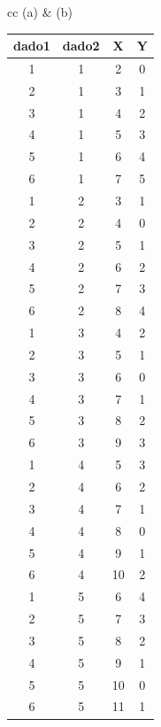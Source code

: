 \begin{ejemplo}
\begin{table}[p]
\begin{center}
\begin{tabular}{cc}
(a) & (b)\\[5mm]
{\scriptsize
\begin{tabular}{|c|c|c|c|}
  \hline
dado1 & dado2 & X & Y \\
  \hline
  1 &   1 &   2 &   0 \\ \hline
    2 &   1 &   3 &   1 \\ \hline
    3 &   1 &   4 &   2 \\ \hline
    4 &   1 &   5 &   3 \\ \hline
    5 &   1 &   6 &   4 \\ \hline
    6 &   1 &   7 &   5 \\ \hline
    1 &   2 &   3 &   1 \\ \hline
    2 &   2 &   4 &   0 \\ \hline
    3 &   2 &   5 &   1 \\ \hline
    4 &   2 &   6 &   2 \\ \hline
    5 &   2 &   7 &   3 \\ \hline
    6 &   2 &   8 &   4 \\ \hline
    1 &   3 &   4 &   2 \\ \hline
    2 &   3 &   5 &   1 \\ \hline
    3 &   3 &   6 &   0 \\ \hline
    4 &   3 &   7 &   1 \\ \hline
    5 &   3 &   8 &   2 \\ \hline
    6 &   3 &   9 &   3 \\ \hline
    1 &   4 &   5 &   3 \\ \hline
    2 &   4 &   6 &   2 \\ \hline
    3 &   4 &   7 &   1 \\ \hline
    4 &   4 &   8 &   0 \\ \hline
    5 &   4 &   9 &   1 \\ \hline
    6 &   4 &  10 &   2 \\ \hline
    1 &   5 &   6 &   4 \\ \hline
    2 &   5 &   7 &   3 \\ \hline
    3 &   5 &   8 &   2 \\ \hline
    4 &   5 &   9 &   1 \\ \hline
    5 &   5 &  10 &   0 \\ \hline
    6 &   5 &  11 &   1 \\ \hline

\end{tabular}}
\end{tabular}
\end{center}
\end{table}
\end{ejemplo}
